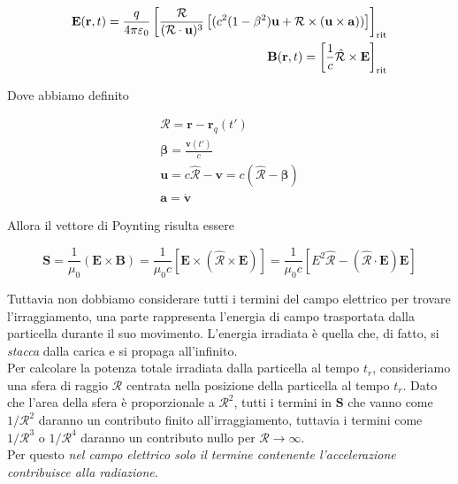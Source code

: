 \begin{tcolorbox}[colback=yellow!10!white, colframe=orange!70!black, boxrule=0.8pt]
\begin{align} 
    \mathbf{E}(\mathbf{r}, t) = \frac{q}{4 \pi \varepsilon_0} \left[\frac{\mathcal{R}}{(\mathbf{\mathcal{R}} \cdot \mathbf{u})^3} \left[(c^2 (1 - \beta^2) \mathbf{u} + \mathbf{\mathcal{R}} \times (\mathbf{u} \times \mathbf{a}))\right] \right]_{\text{rit}} \label{eq: campo_elettrico_carica_moto}\\
    \mathbf{B}(\mathbf{r}, t) = \left[ \frac{1}{c} \hat{\mathcal{R}} \times \mathbf{E} \right]_{\text{rit}} \label{eq: campo_magnetico_carica_moto}
\end{align}
\end{tcolorbox}

\newpage

Dove abbiamo definito 

\begin{align*}
    \boldsymbol{\mathcal{R}} = \mathbf{r} - \mathbf{r}_q(t') \\
    \boldsymbol{\beta} = \frac{\mathbf{v}(t')}{c} \\
    \mathbf{u} = c \hat{\mathcal{R}} - \mathbf{v} = c (\hat{\mathcal{R}} - \mathbf{\beta})\\
    \mathbf{a} = \dot{\mathbf{v}}
\end{align*}

Allora il vettore di Poynting risulta essere 

\begin{equation} \label{eq: Poynting_irr}
    \mathbf{S} = \frac{1}{\mu_0} (\mathbf{E} \times \mathbf{B}) = \frac{1}{\mu_0 c} [\mathbf{E} \times (\hat{\mathbf{\mathcal{R}}} \times \mathbf{E})] = \frac{1}{\mu_0 c}[E^2 \hat{\mathbf{\mathcal{R}}} - (\hat{\mathbf{\mathcal{R}}} \cdot \mathbf{E})\mathbf{E}]
\end{equation}

Tuttavia non dobbiamo considerare tutti i termini del campo elettrico per trovare l'irraggiamento, una parte rappresenta l'energia di campo trasportata dalla particella durante il suo movimento. L'energia irradiata è quella che, di fatto, si \emph{stacca} dalla carica e si propaga all'infinito. \\

Per calcolare la potenza totale irradiata dalla particella al tempo $t_r$, consideriamo una sfera di raggio $\mathcal{R}$ centrata nella posizione della particella al tempo $t_r$. Dato che l'area della sfera è proporzionale a $\mathcal{R}^2$, tutti i termini in $\mathbf{S}$ che vanno come $1/\mathcal{R}^2$ daranno un contributo finito all'irraggiamento, tuttavia i termini come $1/\mathcal{R}^3$ o $1/\mathcal{R}^4$ daranno un contributo nullo per $\mathcal{R} \to \infty$.\\
Per questo \emph{nel campo elettrico solo il termine contenente l'accelerazione contribuisce alla radiazione}. 

